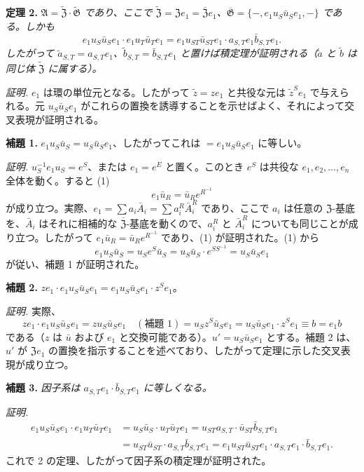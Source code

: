 \noindent\textbf{定理 2.} \emph{\(\mathfrak A=\widetilde{\mathfrak Z}\cdot\widetilde{\mathfrak G}\) であり、ここで \(\widetilde{\mathfrak Z}=\mathfrak Ze_1=\overline{\mathfrak Z}e_1\)、\(\overline{\mathfrak G}=\{-,e_1u_S\bar u_Se_1,-\}\) である。しかも}
\[
e_1u_S\bar u_Se_1\cdot e_1u_T\bar u_Te_1
=e_1u_{ST}\bar u_{ST}e_1\cdot a_{S,T}e_1\bar b_{S,T}e_1.
\]
\emph{したがって \(\tilde a_{S,T}=a_{S,T}e_1\)、\(\tilde b_{S,T}=\bar b_{S,T}e_1\) と置けば積定理が証明される（\(\tilde a\) と \(\tilde b\) は同じ体 \(\widetilde{\mathfrak Z}\) に属する）。}

\noindent\emph{証明.} \(e_1\) は環の単位元となる。したがって \(\tilde z=ze_1\) と共役な元は \(\tilde z^Se_1\) で与えられる。元 \(u_S\bar u_Se_1\) がこれらの置換を誘導することを示せばよく、それによって交叉表現が証明される。

\noindent\textbf{補題 1.} \(e_1u_S\bar u_S=u_S\bar u_Se_1\)、したがってこれは \(=e_1u_S\bar u_Se_1\) に等しい。

\noindent\emph{証明.} \(u_S^{-1}e_1u_S=e^S\)、または \(e_1=e^E\) と置く。このとき \(e^S\) は共役な \(e_1,e_2,\ldots,e_n\) 全体を動く。すると (1)
\[
e_1\bar u_R=\bar u_Re^{R^{-1}}
\]
が成り立つ。実際、\(e_1=\sum a_i\bar A_i=\sum a_i^R\bar A_i^R\) であり、ここで \(a_i\) は任意の \(\mathfrak Z\)-基底を、\(\bar A_i\) はそれに相補的な \(\overline{\mathfrak Z}\)-基底を動くので、\(a_i^R\) と \(\bar A_i^R\) についても同じことが成り立つ。したがって \(e_1\bar u_R=\bar u_Re^{R^{-1}}\) であり、(1) が証明された。(1) から
\[
e_1u_S\bar u_S=u_Se^S\bar u_S
=u_S\bar u_S\cdot e^{SS^{-1}}=u_S\bar u_Se_1
\]
が従い、補題 1 が証明された。

\noindent\textbf{補題 2.} \(ze_1\cdot e_1u_S\bar u_Se_1=e_1u_S\bar u_Se_1\cdot z^Se_1\)。

\noindent\emph{証明.} 実際、
\[
ze_1\cdot e_1u_S\bar u_Se_1
=zu_S\bar u_Se_1\quad(\text{補題 1})
=u_Sz^S\bar u_Se_1
=u_S\bar u_Se_1\cdot z^Se_1
\equiv b=e_1b
\]
である（\(z\) は \(\bar u\) および \(e_1\) と交換可能である）。\(u'=u_S\bar u_Se_1\) とする。補題 2 は、\(u'\) が \(\mathfrak Ze_1\) の置換を指示することを述べており、したがって定理に示した交叉表現が成り立つ。

\noindent\textbf{補題 3.} \emph{因子系は \(a_{S,T}e_1\cdot\bar b_{S,T}e_1\) に等しくなる。}

\noindent\emph{証明.}
\[
\begin{aligned}
e_1u_S\bar u_Se_1\cdot e_1u_T\bar u_Te_1
&=u_S\bar u_S\cdot u_T\bar u_Te_1
=u_{ST}a_{S,T}\cdot\bar u_{ST}\bar b_{S,T}e_1\\
&=u_{ST}\bar u_{ST}\cdot a_{S,T}\bar b_{S,T}e_1
=e_1u_{ST}\bar u_{ST}e_1\cdot a_{S,T}e_1\cdot\bar b_{S,T}e_1.
\end{aligned}
\]
これで 2 の定理、したがって因子系の積定理が証明された。

